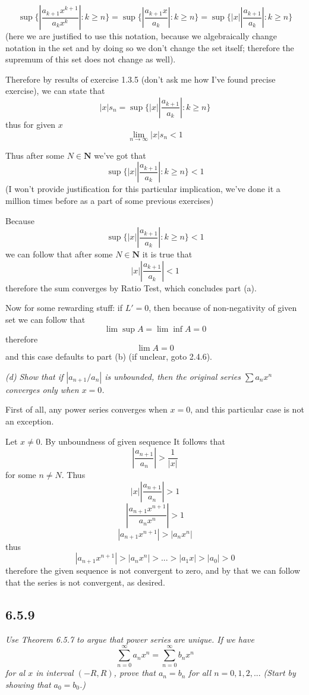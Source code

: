 \documentclass[11pt,oneside,titlepage]{book}
\begin{document}
$$\sup{\{\left|\frac{a_{k + 1}x^{k + 1}}{a_k x^k}\right|: k \geq n\}} =
\sup{\{\left|\frac{a_{k + 1}x}{a_k}\right|: k \geq n\}} =
\sup{\{|x|\left|\frac{a_{k + 1}}{a_k}\right|: k \geq n\}}
$$
(here we are justified to use this notation, because we algebraically change
notation in the set and by doing so we don't change the set itself; therefore
the supremum of this set does not change as well).

Therefore by results of exercise 1.3.5 (don't ask me how I've found precise
exercise), we can state that
$$|x| s_n = 
\sup{\{|x|\left|\frac{a_{k + 1}}{a_k}\right|: k \geq n\}}$$
thus for given $x$ 
$$\lim_{n \to \infty}{|x|s_n} < 1$$

Thus after some $N \in \textbf{N}$ we've got that 
$$\sup{\{|x|\left|\frac{a_{k + 1}}{a_k}\right|: k \geq n\}} < 1$$
(I won't provide justification for this particular implication, we've done
it a million times before as a part of some previous exercises)

Because
$$\sup{\{|x|\left|\frac{a_{k + 1}}{a_k}\right|: k \geq n\}} < 1$$
we can follow that after some $N \in \textbf{N}$ it is true that
$$|x|\left|\frac{a_{k + 1}}{a_k}\right| < 1$$
therefore the sum converges by Ratio Test, which concludes part (a).

Now for some rewarding stuff: if $L' = 0$, then because of non-negativity
of given set we can follow that
$$\lim\sup A = \lim \inf A = 0$$
therefore
$$\lim A = 0$$
and this case defaults to part (b) (if unclear, goto 2.4.6).

\textit{(d) Show that if $|a_{n + 1}/a_n|$ is unbounded, then the original
  series $\sum a_n x^n$ converges only when $x = 0$.}

First of all, any power series converges when $x = 0$, and this particular
case is not an exception.

Let $x \neq 0$. By unboundness of given sequence It follows that
$$\left|\frac{a_{n + 1}}{a_n}\right| > \frac{1}{|x|}$$
for some $n \neq N$. Thus
$$|x|\left|\frac{a_{n + 1}}{a_n}\right| > 1$$
$$\left|\frac{a_{n + 1}x^{n + 1}}{a_n x^n}\right| > 1$$
$$\left|a_{n + 1}x^{n + 1}\right| > |a_n x^n|$$
thus
$$\left|a_{n + 1}x^{n + 1}\right| > |a_n x^n| > ... > |a_1 x| > |a_0| > 0$$
therefore the given sequence is not convergent to zero, and by that we can
follow that the series is not convergent, as desired.

\subsection*{6.5.9}
\textit{Use Theorem 6.5.7 to argue that power series are unique. If we have}
$$\sum_{n = 0}^{\infty}{a_n x^n} = \sum_{n = 0}^{\infty}{b_n x^n}$$
\textit{for al $x$ in interval $(-R, R)$, prove that $a_n = b_n$ for all
  $n = 0, 1, 2, ...$ (Start by showing that $a_0 = b_0$.)}
\end{document}
